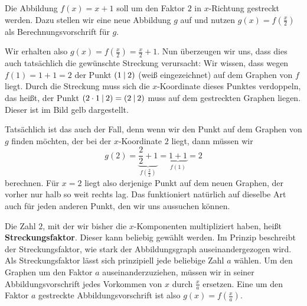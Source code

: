 \documentclass[../../main.tex]{subfiles}
\begin{document}
\begin{example}

    Die Abbildung $f(x)=x+1$ soll um den Faktor $2$ in $x$-Richtung gestreckt werden. Dazu stellen wir eine neue Abbildung $g$ auf und nutzen $g(x)=f(\frac{x}{2})$ als Berechnungsvorschrift für $g$.
    
    Wir erhalten also $g(x)=f(\frac{x}{2})=\frac{x}{2}+1$. Nun überzeugen wir uns, dass dies auch tatsächlich die gewünschte Streckung verursacht: Wir wissen, dass wegen $f(1)=1+1=2$ der Punkt $\left(1 \:\middle|\: 2\right)$ (weiß eingezeichnet) auf dem Graphen von $f$ liegt. Durch die Streckung muss sich die $x$-Koordinate dieses Punktes verdoppeln, das heißt, der Punkt $\left(2\cdot 1 \:\middle|\: 2\right)=\left(2 \:\middle|\: 2\right)$ muss auf dem gestreckten Graphen liegen. Dieser ist im Bild gelb dargestellt.
    
    Tatsächlich ist das auch der Fall, denn wenn wir den Punkt auf dem Graphen von $g$ finden möchten, der bei der $x$-Koordinate $2$ liegt, dann müssen wir
    \[g(2)=\underbrace{\frac{2}{2}+1}_{f(\frac{2}{2})}=\underbrace{1+1}_{f(1)}=2\] 
    berechnen. Für $x=2$ liegt also derjenige Punkt auf dem neuen Graphen, der vorher nur halb so weit rechts lag. Das funktioniert natürlich auf dieselbe Art auch für jeden anderen Punkt, den wir uns aussuchen können.
\end{example}

Die Zahl $2$, mit der wir bisher die $x$-Komponenten multipliziert haben, heißt \textbf{Streckungsfaktor}. Dieser kann beliebig gewählt werden. Im Prinzip beschreibt der Streckungsfaktor, wie stark der Abbildungsgraph auseinandergezogen wird. Als Streckungsfaktor lässt sich prinzipiell jede beliebige Zahl $a$ wählen. Um den Graphen um den Faktor $a$ auseinanderzuziehen, müssen wir in seiner Abbildungsvorschrift jedes Vorkommen von $x$ durch $\frac{x}{a}$ ersetzen. Eine um den Faktor $a$ gestreckte Abbildungsvorschrift ist also $g(x)=f(\frac{x}{a})$.
\end{document}
